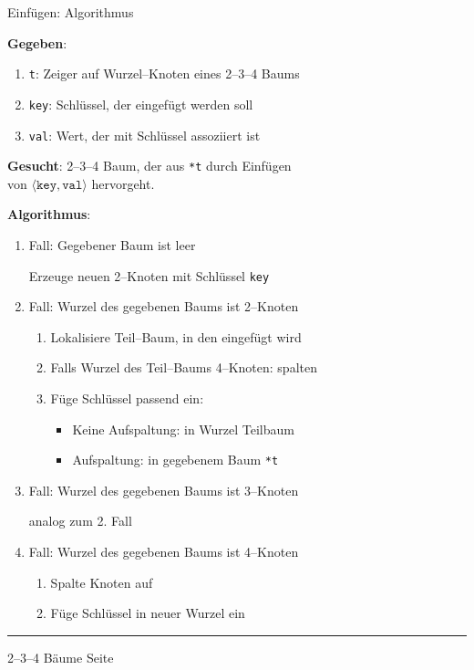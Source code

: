 \begin{slide}{}
\normalsize

\begin{center}
Einf\"ugen: Algorithmus
\end{center}
\vspace*{0.5cm}

\footnotesize
\textbf{Gegeben}: 
\begin{enumerate}
\item \texttt{t}:  Zeiger auf Wurzel--Knoten eines 2--3--4 Baums
\item \texttt{key}: Schl\"ussel, der eingef\"ugt werden soll
\item \texttt{val}: Wert, der mit Schl\"ussel assoziiert ist
\end{enumerate}
\textbf{Gesucht}: 2--3--4 Baum, der aus \texttt{*t} durch Einf\"ugen \\
\hspace*{2.8cm} von $\langle \mathtt{key}, \mathtt{val} \rangle$ hervorgeht.

\textbf{Algorithmus}:
\begin{enumerate}
\item Fall: Gegebener Baum ist leer
    
      Erzeuge neuen 2--Knoten mit Schl\"ussel \texttt{key}
\item Fall: Wurzel des gegebenen Baums ist 2--Knoten
  \begin{enumerate}
  \item Lokalisiere Teil--Baum, in den eingef\"ugt wird
  \item Falls Wurzel des Teil--Baums 4--Knoten: spalten
  \item F\"uge Schl\"ussel passend ein:
    \begin{itemize}
    \item Keine Aufspaltung: in Wurzel Teilbaum
    \item Aufspaltung: in gegebenem Baum \texttt{*t}
    \end{itemize}
  \end{enumerate}
\item Fall: Wurzel des gegebenen Baums ist 3--Knoten

      analog zum 2. Fall
\item Fall: Wurzel des gegebenen Baums ist 4--Knoten
  \begin{enumerate}
  \item Spalte Knoten auf
  \item F\"uge Schl\"ussel in neuer Wurzel ein
  \end{enumerate}
\end{enumerate}


\vspace*{\fill}
\tiny \addtocounter{mypage}{1}
\rule{17cm}{1mm}
2--3--4 B\"aume  \hspace*{\fill} Seite 
\end{slide}

